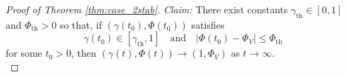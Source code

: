 \documentclass[10pt]{article}
\theoremstyle{definition}
\theoremstyle{definition}
\numberwithin{equation}{section}
\newcommand{\gammaTH}{\gamma_{\mathrm{th}}}
\newcommand{\PhiV}{\Phi_{V}}
\newcommand{\PhiTH}{\Phi_{\mathrm{th}}}
\begin{document}
\begin{proof}[Proof of Theorem \ref{thm:case_2stab}]





\textit{Claim:} There exist constants $\gammaTH \in [0,1]$ and $\PhiTH > 0$ so that, if $(\gamma(t_0), \Phi(t_0))$ satisfies  
\begin{equation}\label{eq:case2_TH}
\gamma(t_0) \in [\gammaTH, 1] \quad \text{and} \quad |\Phi(t_0) - \PhiV| \leq \PhiTH
\end{equation}
for some $t_0>0$, then $(\gamma(t), \Phi(t)) \rightarrow (1, \PhiV)$ as $t \rightarrow \infty$.\\


\end{proof}
\end{document}
